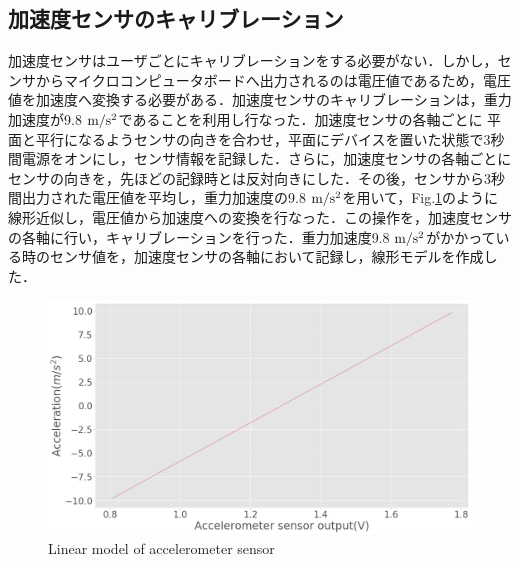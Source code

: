 \subsection*{加速度センサのキャリブレーション}
加速度センサはユーザごとにキャリブレーションをする必要がない．しかし，センサからマイクロコンピュータボードへ出力されるのは電圧値であるため，電圧値を加速度へ変換する必要がある．加速度センサのキャリブレーションは，重力加速度が9.8 $\rm{m/s^2}$であることを利用し行なった．加速度センサの各軸ごとに
平面と平行になるようセンサの向きを合わせ，平面にデバイスを置いた状態で3秒間電源をオンにし，センサ情報を記録した．さらに，加速度センサの各軸ごとにセンサの向きを，先ほどの記録時とは反対向きにした．その後，センサから3秒間出力された電圧値を平均し，重力加速度の9.8 $\rm{m/s^2}$を用いて，Fig.\ref{fig:cali_accel}のように線形近似し，電圧値から加速度への変換を行なった．この操作を，加速度センサの各軸に行い，キャリブレーションを行った．重力加速度9.8 $\rm{m/s^2}$がかかっている時のセンサ値を，加速度センサの各軸において記録し，線形モデルを作成した．

\begin{figure}[H]
  \centering
  \includegraphics[width=0.8\linewidth]{fig/accel_linearmodel}
  \caption{Linear model of accelerometer sensor }
  \label{fig:cali_accel}
\end{figure}

